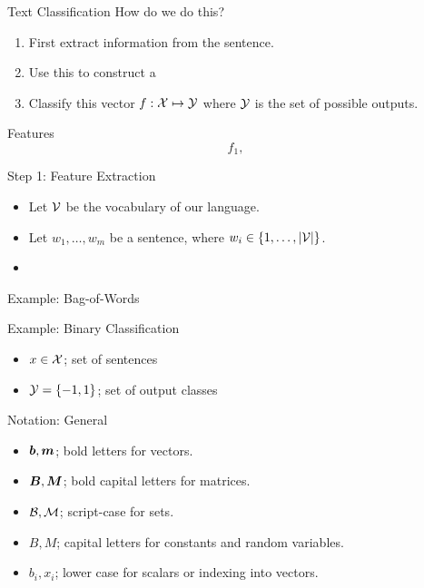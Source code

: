 \documentclass{beamer}
\begin{document}
\begin{frame}{Text Classification}
  How do we do this? 

  \begin{enumerate}
  \item First extract information from the sentence. 
  \item Use this to construct a 
  \item Classify this vector $f: \mathcal{X} \mapsto \mathcal{Y}$ where $\mathcal{Y}$ 
    is the set of possible outputs.
  \end{enumerate}

\end{frame}


\begin{frame}{Features}
  \[f_1, \]
\end{frame}

\begin{frame}{Step 1: Feature Extraction}
  \begin{itemize}
  \item Let $\mathcal{V}$ be the vocabulary of our language.  
  \item  Let $w_1, \ldots, w_m$ be a sentence, where 
    $w_i \in \{1,\ldots, |\mathcal{V}|\}$.
  \item 
  \end{itemize}
\end{frame}

\begin{frame}{Example: Bag-of-Words}
  
\end{frame}

\begin{frame}{Example: Binary Classification}
  \begin{itemize}
  \item $x \in \mathcal{X}$; set of sentences
  \item $\mathcal{Y} = \{-1, 1\}$; set of output classes
  \end{itemize}
  
\end{frame}

\begin{frame}{Notation: General}
  \begin{itemize}
  \item $\boldsymbol{b}, \boldsymbol{m}$;  bold letters for vectors.
  \item $\boldsymbol{B}, \boldsymbol{M}$;  bold capital letters for matrices.
  \item $\mathcal{B}, \mathcal{M}$;  script-case for sets.
  \item $B, M$; capital letters for constants and random variables.
  \item $b_i, x_i$; lower case for scalars or indexing into vectors.
  \end{itemize}
\end{frame}
\end{document}
